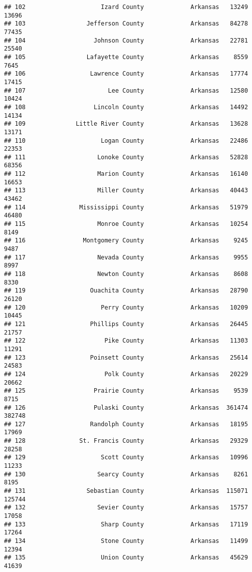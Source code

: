\documentclass[
]{article}
\begin{document}
\begin{verbatim}
## 102                     Izard County             Arkansas   13249   13696
## 103                 Jefferson County             Arkansas   84278   77435
## 104                   Johnson County             Arkansas   22781   25540
## 105                 Lafayette County             Arkansas    8559    7645
## 106                  Lawrence County             Arkansas   17774   17415
## 107                       Lee County             Arkansas   12580   10424
## 108                   Lincoln County             Arkansas   14492   14134
## 109              Little River County             Arkansas   13628   13171
## 110                     Logan County             Arkansas   22486   22353
## 111                    Lonoke County             Arkansas   52828   68356
## 112                    Marion County             Arkansas   16140   16653
## 113                    Miller County             Arkansas   40443   43462
## 114               Mississippi County             Arkansas   51979   46480
## 115                    Monroe County             Arkansas   10254    8149
## 116                Montgomery County             Arkansas    9245    9487
## 117                    Nevada County             Arkansas    9955    8997
## 118                    Newton County             Arkansas    8608    8330
## 119                  Ouachita County             Arkansas   28790   26120
## 120                     Perry County             Arkansas   10209   10445
## 121                  Phillips County             Arkansas   26445   21757
## 122                      Pike County             Arkansas   11303   11291
## 123                  Poinsett County             Arkansas   25614   24583
## 124                      Polk County             Arkansas   20229   20662
## 125                   Prairie County             Arkansas    9539    8715
## 126                   Pulaski County             Arkansas  361474  382748
## 127                  Randolph County             Arkansas   18195   17969
## 128               St. Francis County             Arkansas   29329   28258
## 129                     Scott County             Arkansas   10996   11233
## 130                    Searcy County             Arkansas    8261    8195
## 131                 Sebastian County             Arkansas  115071  125744
## 132                    Sevier County             Arkansas   15757   17058
## 133                     Sharp County             Arkansas   17119   17264
## 134                     Stone County             Arkansas   11499   12394
## 135                     Union County             Arkansas   45629   41639

\end{verbatim}
\end{document}
